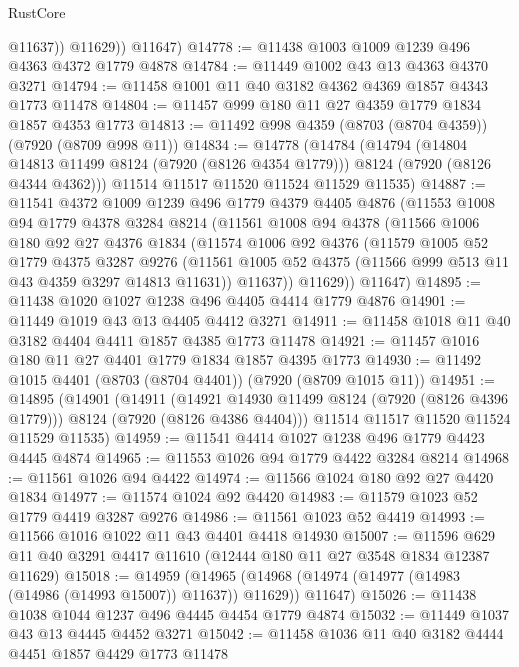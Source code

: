 \begin{lexlean}{RustCore}
\begin{coremodule}
              @11637))
          @11629))
      @11647)
@14778 := @11438 @1003 @1009 @1239 @496 @4363 @4372 @1779 @4878
@14784 := @11449 @1002 @43 @13 @4363 @4370 @3271
@14794 := @11458 @1001 @11 @40 @3182 @4362 @4369 @1857 @4343 @1773 @11478
@14804 := @11457 @999 @180 @11 @27 @4359 @1779 @1834 @1857 @4353 @1773
@14813 := @11492 @998 @4359 (@8703 (@8704 @4359)) (@7920 (@8709 @998 @11))
@14834 := @14778
    (@14784
      (@14794
        (@14804 @14813 @11499 @8124 (@7920 (@8126 @4354 @1779)))
        @8124
        (@7920 (@8126 @4344 @4362)))
      @11514
      @11517
      @11520
      @11524
      @11529
      @11535)
@14887 := @11541
    @4372
    @1009
    @1239
    @496
    @1779
    @4379
    @4405
    @4876
    (@11553
      @1008
      @94
      @1779
      @4378
      @3284
      @8214
      (@11561
        @1008
        @94
        @4378
        (@11566
          @1006
          @180
          @92
          @27
          @4376
          @1834
          (@11574
            @1006
            @92
            @4376
            (@11579
              @1005
              @52
              @1779
              @4375
              @3287
              @9276
              (@11561 @1005 @52 @4375 (@11566 @999 @513 @11 @43 @4359 @3297 @14813 @11631))
              @11637))
          @11629))
      @11647)
@14895 := @11438 @1020 @1027 @1238 @496 @4405 @4414 @1779 @4876
@14901 := @11449 @1019 @43 @13 @4405 @4412 @3271
@14911 := @11458 @1018 @11 @40 @3182 @4404 @4411 @1857 @4385 @1773 @11478
@14921 := @11457 @1016 @180 @11 @27 @4401 @1779 @1834 @1857 @4395 @1773
@14930 := @11492 @1015 @4401 (@8703 (@8704 @4401)) (@7920 (@8709 @1015 @11))
@14951 := @14895
    (@14901
      (@14911
        (@14921 @14930 @11499 @8124 (@7920 (@8126 @4396 @1779)))
        @8124
        (@7920 (@8126 @4386 @4404)))
      @11514
      @11517
      @11520
      @11524
      @11529
      @11535)
@14959 := @11541 @4414 @1027 @1238 @496 @1779 @4423 @4445 @4874
@14965 := @11553 @1026 @94 @1779 @4422 @3284 @8214
@14968 := @11561 @1026 @94 @4422
@14974 := @11566 @1024 @180 @92 @27 @4420 @1834
@14977 := @11574 @1024 @92 @4420
@14983 := @11579 @1023 @52 @1779 @4419 @3287 @9276
@14986 := @11561 @1023 @52 @4419
@14993 := @11566 @1016 @1022 @11 @43 @4401 @4418 @14930
@15007 := @11596 @629 @11 @40 @3291 @4417 @11610 (@12444 @180 @11 @27 @3548 @1834 @12387 @11629)
@15018 := @14959
    (@14965 (@14968 (@14974 (@14977 (@14983 (@14986 (@14993 @15007)) @11637)) @11629)) @11647)
@15026 := @11438 @1038 @1044 @1237 @496 @4445 @4454 @1779 @4874
@15032 := @11449 @1037 @43 @13 @4445 @4452 @3271
@15042 := @11458 @1036 @11 @40 @3182 @4444 @4451 @1857 @4429 @1773 @11478

\end{coremodule}
\end{lexlean}
